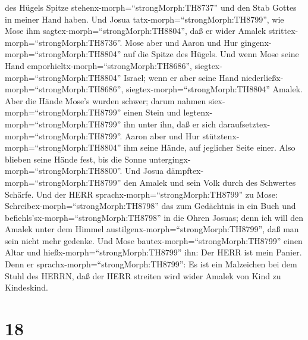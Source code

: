 des Hügels Spitze stehenx-morph=``strongMorph:TH8737'' und den Stab
Gottes in meiner Hand haben.  Und Josua
tatx-morph=``strongMorph:TH8799'', wie Mose ihm
sagtex-morph=``strongMorph:TH8804'', daß er wider Amalek
strittex-morph=``strongMorph:TH8736''. Mose aber und Aaron und Hur
gingenx-morph=``strongMorph:TH8804'' auf die Spitze des Hügels.
 Und wenn Mose seine Hand
emporhieltx-morph=``strongMorph:TH8686'',
siegtex-morph=``strongMorph:TH8804'' Israel; wenn er aber seine Hand
niederließx-morph=``strongMorph:TH8686'',
siegtex-morph=``strongMorph:TH8804'' Amalek.  Aber die
Hände Mose's wurden schwer; darum nahmen
siex-morph=``strongMorph:TH8799'' einen Stein und
legtenx-morph=``strongMorph:TH8799'' ihn unter ihn, daß er sich
daraufsetztex-morph=``strongMorph:TH8799''. Aaron aber und Hur
stütztenx-morph=``strongMorph:TH8804'' ihm seine Hände, auf jeglicher
Seite einer. Also blieben seine Hände fest, bis die Sonne
untergingx-morph=``strongMorph:TH8800''.  Und Josua
dämpftex-morph=``strongMorph:TH8799'' den Amalek und sein Volk durch des
Schwertes Schärfe.  Und der HERR
sprachx-morph=``strongMorph:TH8799'' zu Mose:
Schreibex-morph=``strongMorph:TH8798'' das zum Gedächtnis in ein Buch
und befiehls'sx-morph=``strongMorph:TH8798'' in die Ohren Josuas; denn
ich will den Amalek unter dem Himmel
austilgenx-morph=``strongMorph:TH8799'', daß man sein nicht mehr
gedenke.  Und Mose bautex-morph=``strongMorph:TH8799''
einen Altar und hießx-morph=``strongMorph:TH8799'' ihn: Der HERR ist
mein Panier.  Denn er sprachx-morph=``strongMorph:TH8799'':
Es ist ein Malzeichen bei dem Stuhl des HERRN, daß der HERR streiten
wird wider Amalek von Kind zu Kindeskind.

\hypertarget{section-17}{%
\section{18}\label{section-17}}

